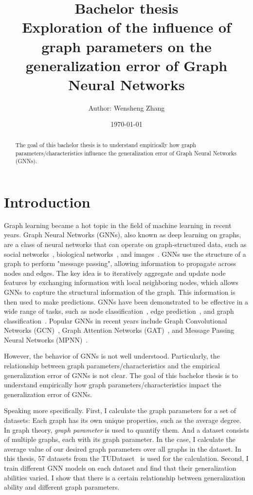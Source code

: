 \documentclass{article}
\title{\textbf{Bachelor thesis}\\
Exploration of the influence of graph parameters on the generalization error of Graph Neural Networks}
\author{Author: Wensheng Zhang}
\date{\today}
\begin{document}
 

\maketitle



\begin{abstract}
The goal of this bachelor thesis is to understand empirically how graph parameters/characteristics influence the generalization error of Graph Neural Networks (GNNs).
\end{abstract}

\section{Introduction}\label{sec:intro}
Graph learning became a hot topic in the field of machine learning in recent years. Graph Neural Networks (GNNs), also known as deep learning on graphs, are a class of neural networks that can operate on graph-structured data, such as social networks~\cite{easley2010networks}, biological networks~\cite{barabasi2004network}, and images~\cite{simonovsky2017dynamic}. GNNs use the structure of a graph to perform "message passing", allowing information to propagate across nodes and edges. The key idea is to iteratively aggregate and update node features by exchanging information with local neighboring nodes, which allows GNNs to capture the structural information of the graph. This information is then used to make predictions. GNNs have been demonstrated to be effective in a wide range of tasks, such as node classification~\cite{hamilton2017inductive}, edge prediction~\cite{morselli2021network}, and graph classification~\cite{gilmer2017neural}. Popular GNNs in recent years include Graph Convolutional Networks (GCN)~\cite{kipf2016semi}, Graph Attention Networks (GAT)~\cite{velickovic2020pointer}, and Message Passing Neural Networks (MPNN)~\cite{gilmer2017neural}.  

However, the behavior of GNNs is not well understood. Particularly, the relationship between graph parameters/characteristics and the empirical generalization error of GNNs is not clear.  The goal of this bachelor thesis is to understand empirically how graph parameters/characteristics impact the generalization error of GNNs. 

Speaking more specifically.
First, I calculate the graph parameters for a set of datasets: Each graph has its own unique properties, such as the average degree. In graph theory, \textit{graph parameter} is used to quantify them. And a dataset consists of multiple graphs, each with its graph parameter. In the case, I calculate the average value of our desired graph parameters over all graphs in the dataset. In this thesis, 57 datasets from the TUDataset~\cite{morris2020tudataset} is used for the calculation. Second, I train different GNN models on each dataset and find that their generalization abilities varied. I show that there is a certain relationship between generalization ability and different graph parameters.
\end{document}
